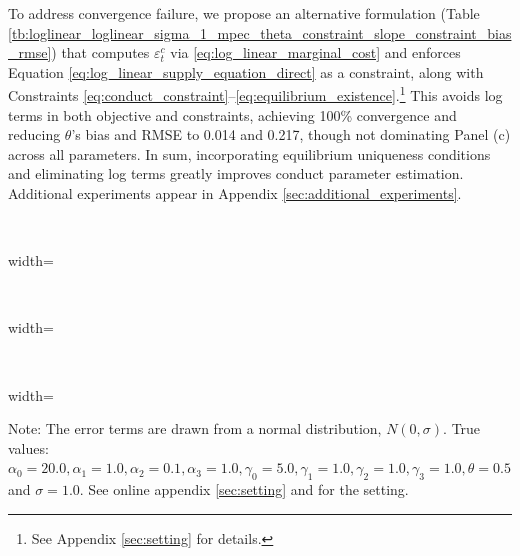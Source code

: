 \documentclass[11pt, a4paper]{article}
\theoremstyle{remark}
\begin{document}
To address convergence failure, we propose an alternative formulation (Table \ref{tb:loglinear_loglinear_sigma_1_mpec_theta_constraint_slope_constraint_bias_rmse}) that computes $\varepsilon^c_t$ via \eqref{eq:log_linear_marginal_cost} and enforces Equation \eqref{eq:log_linear_supply_equation_direct} as a constraint, along with Constraints \eqref{eq:conduct_constraint}–\eqref{eq:equilibrium_existence}.\footnote{See Appendix \ref{sec:setting} for details.}
This avoids log terms in both objective and constraints, achieving 100\% convergence and reducing $\theta$'s bias and RMSE to 0.014 and 0.217, though not dominating Panel (c) across all parameters.
In sum, incorporating equilibrium uniqueness conditions and eliminating log terms greatly improves conduct parameter estimation. Additional experiments appear in Appendix \ref{sec:additional_experiments}.


\begin{table}[!htbp]
  \begin{center}
  \caption{Performance comparison}
    \label{tb:loglinear_loglinear_sigma_1_simultaneous_non_constraint_theta_constraint_bias_rmse} 
  \\[0.5em]
  \begin{adjustbox}{width=\textwidth}
    
  \end{adjustbox}

  \vspace{1em}

  \\[0.5em]
  \begin{adjustbox}{width=\textwidth}
    
  \end{adjustbox}

  \vspace{1em}

  \\[0.5em]
  \begin{adjustbox}{width=\textwidth}
    
  \end{adjustbox}
  \end{center}
  \footnotesize
  Note: The error terms are drawn from a normal distribution, $N(0, \sigma)$. True values: $\alpha_0=20.0, \alpha_1=1.0, \alpha_2=0.1, \alpha_3=1.0, \gamma_0=5.0, \gamma_1=1.0, \gamma_2=1.0, \gamma_3=1.0, \theta=0.5$ and $\sigma=1.0$. See online appendix \ref{sec:setting} and \cite{matsumura2024challenges} for the setting.
\end{table}
\end{document}
